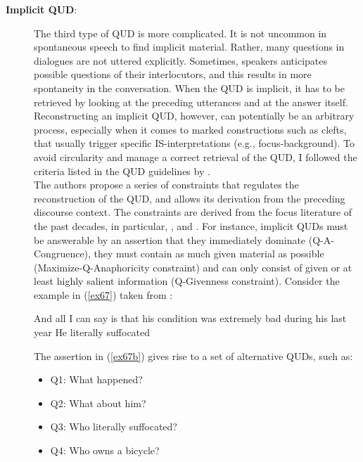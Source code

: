 \begin{description}
\item[\textbf{Implicit QUD}:] The third type of QUD is more complicated. It is not uncommon in spontaneous speech to find implicit material. Rather, many questions in dialogues are not uttered explicitly. Sometimes, speakers anticipates possible questions of their interlocutors, and this results in more spontaneity in the conversation. When the QUD is implicit, it has to be retrieved by looking at the preceding utterances and at the answer itself.
Reconstructing an implicit QUD, however, can potentially be an arbitrary process, especially when it comes to marked constructions such as clefts, that usually trigger specific IS-interpretations (e.g., focus-background). To avoid circularity and manage a correct retrieval of the QUD, I followed the criteria listed in the QUD guidelines by \textcite{riester2018annotation, riester2019constructing}.\\
The authors propose a series of constraints that regulates the reconstruction of the QUD, and allows its derivation from the preceding discourse context. The constraints are derived from the focus literature of the past decades, in particular, \textcite{rooth1992theory}, \textcite{schwarzschild1999givenness} and \textcite{buring2009towards}. For instance, implicit QUDs must be answerable by an assertion that they immediately dominate (Q-A-Congruence), they must contain as much given material as possible (Maximize-Q-Anaphoricity constraint) and can only consist of given or at least highly salient information (Q-Givenness constraint). Consider the example in (\ref{ex67}) taken from \textcite{riester2019constructing}:

\ea \label{ex67}
\ea \label{ex67a}  And all I can say is that his condition was extremely bad during his \vspace{-0,2cm}last year
\ex \label{ex67b} He literally suffocated \hfill \parencite[9]{riester2019constructing}     
\z \z

 The assertion in (\ref{ex67b}) gives rise to a set of alternative QUDs, such as:
\begin{itemize}
	\item Q1: What happened?
	\item Q2: What about him?
	\item Q3: Who literally suffocated?
	\item Q4: Who owns a bicycle?
\end{itemize}



\end{description}
